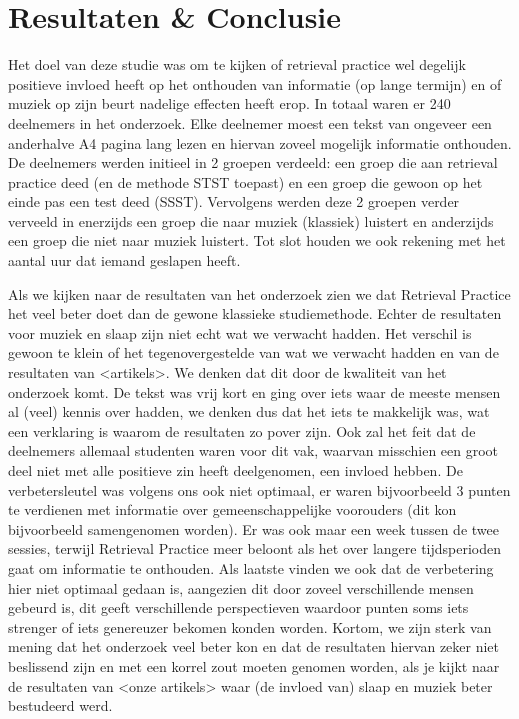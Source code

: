 \documentclass{hogent-article}
\begin{document}
\section{Resultaten \& Conclusie }

Het doel van deze studie was om te kijken of retrieval practice wel degelijk positieve invloed heeft op het onthouden van informatie (op lange termijn) en of muziek op zijn beurt nadelige effecten heeft erop. In totaal waren er 240 deelnemers in het onderzoek. Elke deelnemer moest een tekst van ongeveer een anderhalve A4 pagina lang lezen en hiervan zoveel mogelijk informatie onthouden. De deelnemers werden initieel in 2 groepen verdeeld: een groep die aan retrieval practice deed (en de methode STST toepast) en een groep die gewoon op het einde pas een test deed (SSST). Vervolgens werden deze 2 groepen verder verveeld in enerzijds een groep die naar muziek (klassiek) luistert en anderzijds een groep die niet naar muziek luistert. Tot slot houden we ook rekening met het aantal uur dat iemand geslapen heeft.

Als we kijken naar de resultaten van het onderzoek zien we dat Retrieval Practice het veel beter doet dan de gewone klassieke studiemethode. Echter de resultaten voor muziek en slaap zijn niet echt wat we verwacht hadden. Het verschil is gewoon te klein of het tegenovergestelde van wat we verwacht hadden en van de resultaten van <artikels>. We denken dat dit door de kwaliteit van het onderzoek komt. De tekst was vrij kort en ging over iets waar de meeste mensen al (veel) kennis over hadden, we denken dus dat het iets te makkelijk was, wat een verklaring is waarom de resultaten zo pover zijn. Ook zal het feit dat de deelnemers allemaal studenten waren voor dit vak, waarvan misschien een groot deel niet met alle positieve zin heeft deelgenomen, een invloed hebben. De verbetersleutel was volgens ons ook niet optimaal, er waren bijvoorbeeld 3 punten te verdienen met informatie over gemeenschappelijke voorouders (dit kon bijvoorbeeld samengenomen worden). Er was ook maar een week tussen de twee sessies, terwijl Retrieval Practice meer beloont als het over langere tijdsperioden gaat om informatie te onthouden.  Als laatste vinden we ook dat de verbetering hier niet optimaal gedaan is, aangezien dit door zoveel verschillende mensen gebeurd is, dit geeft verschillende perspectieven waardoor punten soms iets strenger of iets genereuzer bekomen konden worden. Kortom, we zijn sterk van mening dat het onderzoek veel beter kon en dat de resultaten hiervan zeker niet beslissend zijn en met een korrel zout moeten genomen worden, als je kijkt naar de resultaten van <onze artikels> waar (de invloed van) slaap en muziek beter bestudeerd werd.


\printbibliography[heading=bibintoc]
\end{document}
